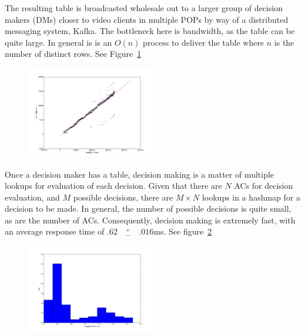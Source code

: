  The resulting table is broadcasted wholesale out to a larger group of decision makers (DMs) closer to video clients in multiple POPs by way of a distributed messaging system, Kafka. The bottleneck here is bandwidth, as the table can be quite large.  In general is is an $O(n)$ process to deliver the table where $n$ is the number of distinct rows. See Figure~\ref{fig:fetching-scale}

\begin{figure}[h!]
\centering
 \includegraphics[width=0.5\textwidth] {figures/fetch_time_scale.pdf}
\label{fig:fetching-scale}
\end{figure}

 Once a decision maker has a table, decision making is a matter of multiple lookups for evaluation of each decision. Given that there are $N$ ACs for decision evaluation, and $M$ possible decisions, there are $M \times N$ lookups in a hashmap for a decision to be made. In general, the number of possible decisions is quite small, as are the number of ACs. Consequently, decision making is extremely fast, with an average response time of $.62 \quad ^{+}_{-}\quad .016$ms. See figure~\ref{fig:query-scale}    

\begin{figure}[h!]
\centering
 \includegraphics[width=0.5\textwidth] {figures/query_scale.pdf}
\label{fig:query-scale}
\end{figure}


